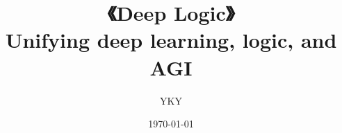 


\usepackage{color}
\usepackage{mathtools}
\usepackage{hyperref}

\usepackage[backend=biber,style=numeric]{biblatex}


\usepackage{graphicx} %
\usepackage{tikz-cd}
\usepackage[export]{adjustbox}%
\usepackage{verbatim} %

\newcommand{\underdash}[1]{%
	\tikz[baseline=(toUnderline.base)]{
		\node[inner sep=1pt,outer sep=10pt] (toUnderline) {#1};
		\draw[dashed] ([yshift=-0pt]toUnderline.south west) -- ([yshift=-0pt]toUnderline.south east);
	}%
}%


\newcommand{\emp}[1]{{\color{violet}#1}}
\newcommand*\confoundFace{$\vcenter{\hbox{\texttt{[image: ../confounded-face.jpg]}}}$}



\title{
{{\Huge《Deep Logic》} \\ \vspace*{0.2cm} Unifying deep learning, logic, and AGI}}
\author{YKY} %
\date{\today} %

\maketitle

